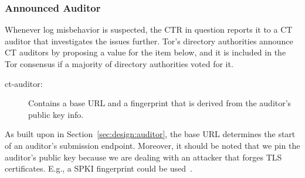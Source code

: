 \subsubsection{Announced Auditor}
Whenever log misbehavior is suspected, the CTR in question reports it to a
CT auditor that investigates the issues further.  Tor's directory authorities
announce CT auditors by proposing a value for the item below, and it is included
in the Tor consensus if a majority of directory authorities voted for it.
\begin{description}
	\item[ct-auditor:] Contains a base URL and a fingerprint that is derived
		from the auditor's public key info.
\end{description}

As built upon in Section~\ref{sec:design:auditor}, the base URL determines the
start of an auditor's submission endpoint.  Moreover, it should be noted that
we pin the auditor's public key because we are dealing with an attacker that
forges TLS certificates.  E.g., a SPKI fingerprint could be used~\cite{hpkp}.

